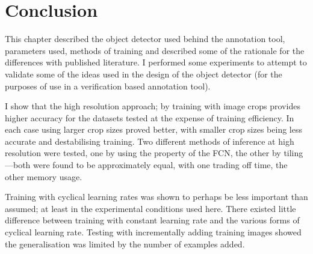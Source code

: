 

\section {Conclusion}

This chapter described the object detector used behind the annotation tool, parameters used, methods of training and described some of the rationale for the differences with published literature. I performed some experiments to attempt to validate some of the ideas used in the design of the object detector (for the purposes of use in a verification based annotation tool). 

I show that the high resolution approach; by training with image crops provides higher accuracy for the datasets tested at the expense of training efficiency. In each case using larger crop sizes proved better, with smaller crop sizes being less accurate and destabilising training. Two different methods of inference at high resolution were tested, one by using the property of the \gls{FCN}, the other by tiling---both were found to be approximately equal, with one trading off time, the other memory usage.

Training with cyclical learning rates was shown to perhaps be less important than assumed; at least in the experimental conditions used here. There existed little difference between training with constant learning rate and the various forms of cyclical learning rate. Testing with incrementally adding training images showed the generalisation was limited by the number of examples added.




